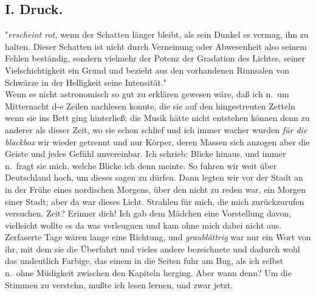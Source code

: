 \documentclass[
]{article}
\author{}
\date{\vspace{-2.5em}}
\begin{document}
\subsection{I. Druck.}\label{i.-druck.}

"\emph{erscheint rot, }wenn der Schatten länger bleibt, als sein Dunkel
es vermag, ihn zu halten. Dieser Schatten ist nicht durch Verneinung
oder Abwesenheit also seinem Fehlen beständig, sondern vielmehr der
Potenz der Gradation des Lichtes, seiner Vielschichtigkeit ein Grund und
bezieht aus den vorhandenen Rinnsalen von Schwärze in der Helligkeit
seine Intensität."\\
Wenn es nicht astronomisch so gut zu erklären gewesen wäre, daß ich
n.~um Mitternacht d-e Zeilen nachlesen konnte, die sie auf den
hingestreuten Zetteln wenn sie ins Bett ging hinterließ; die Musik hätte
nicht entstehen können denn zu anderer als dieser Zeit, wo sie schon
schlief und ich immer wacher wurden \emph{für die blackbox} wir wieder
getrennt und nur Körper, deren Massen sich anzogen aber die Geiste und
jedes Gefühl unvereinbar. Ich schrieb: Blicke hinaus, und immer n.~fragt
sie mich, welche Blicke ich denn meinte. So fuhren wir weit über
Deutschland hoch, um dieses sagen zu dürfen. Dann legten wir vor der
Stadt an in der Frühe eines nordischen Morgens, über den nicht zu reden
war, ein Morgen einer Stadt; aber da war dieses Licht. Strahlen für
mich, die mich zurückzurufen versuchen. Zeit? Erinner dich! Ich gab dem
Mädchen eine Vorstellung davon, vielleicht wollte es da was verleugnen
und kam ohne mich dabei nicht aus. Zerfaserte Tage wären lange eine
Richtung, und \emph{graublättrig} war nur ein Wort von ihr, mit dem sie
die Überfahrt und vieles andere bezeichnete und dadurch wohl das
undeutlich Farbige, das einem in die Seiten fuhr am Bug, als ich selbst
n.~ohne Müdigkeit zwischen den Kapiteln herging. Aber wann denn? Um die
Stimmen zu verstehn, mußte ich lesen lernen, und zwar jetzt.
\end{document}
